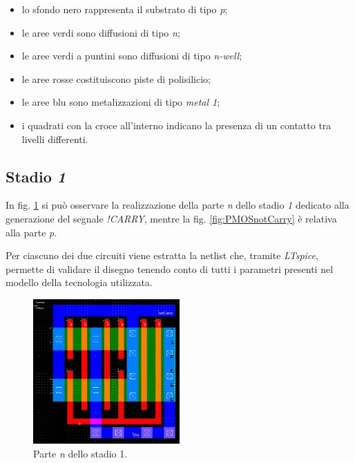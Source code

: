 \begin{itemize}
	\item lo sfondo nero rappresenta il substrato di tipo \textit{p};
	\item le aree verdi sono diffusioni di tipo \textit{n};
	\item le aree verdi a puntini sono diffusioni di tipo \textit{n-well};
	\item le aree rosse costituiscono piste di polisilicio;
	\item le aree blu sono metalizzazioni di tipo \textit{metal 1}; 
	\item i quadrati con la croce all'interno indicano la presenza di un contatto tra livelli differenti.
\end{itemize}

\subsection{Stadio \textit{1}}

In fig. \ref{fig:NMOSnotCarry} si può osservare la realizzazione della parte \textit{n} dello stadio \textit{1} dedicato alla generazione del segnale \textit{!CARRY}, mentre la fig. \ref{fig:PMOSnotCarry} è relativa alla parte \textit{p}. 

Per ciascuno dei due circuiti viene estratta la netlist che, tramite \textit{LTspice}, permette di validare il disegno tenendo conto di tutti i parametri presenti nel modello della tecnologia utilizzata.

\begin{figure}[hbt!]
	\centering
	\includegraphics[width=0.5\textwidth]{figure/Msk_NMOS_notCarry_V2.png}
	\caption{Parte \textit{n} dello stadio 1.}
	\label{fig:NMOSnotCarry}
\end{figure} 

